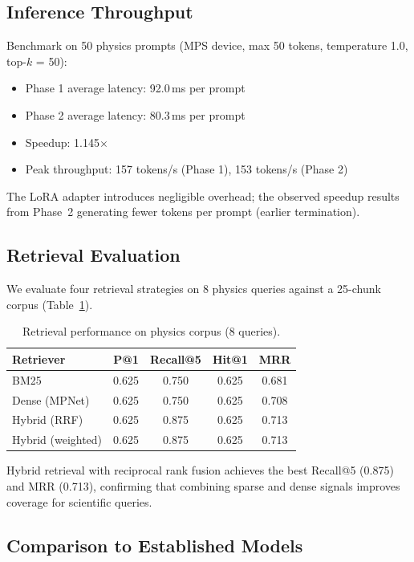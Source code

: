 \documentclass[11pt]{article}
\begin{document}
\subsection{Inference Throughput}

Benchmark on 50 physics prompts (MPS device, max 50 tokens, temperature 1.0, top-$k$ = 50):

\begin{itemize}[leftmargin=*]
    \item Phase 1 average latency: 92.0\,ms per prompt
    \item Phase 2 average latency: 80.3\,ms per prompt
    \item Speedup: 1.145$\times$
    \item Peak throughput: 157 tokens/s (Phase 1), 153 tokens/s (Phase 2)
\end{itemize}

The LoRA adapter introduces negligible overhead; the observed speedup results from Phase~2 generating fewer tokens per prompt (earlier termination).

\subsection{Retrieval Evaluation}

We evaluate four retrieval strategies on 8 physics queries against a 25-chunk corpus (Table~\ref{tab:retrieval}).

\begin{table}[t]
\centering
\caption{Retrieval performance on physics corpus (8 queries).}
\label{tab:retrieval}
\begin{tabular}{lcccc}
\toprule
\textbf{Retriever} & \textbf{P@1} & \textbf{Recall@5} & \textbf{Hit@1} & \textbf{MRR} \\
\midrule
BM25 & 0.625 & 0.750 & 0.625 & 0.681 \\
Dense (MPNet) & 0.625 & 0.750 & 0.625 & 0.708 \\
Hybrid (RRF) & 0.625 & 0.875 & 0.625 & 0.713 \\
Hybrid (weighted) & 0.625 & 0.875 & 0.625 & 0.713 \\
\bottomrule
\end{tabular}
\end{table}

Hybrid retrieval with reciprocal rank fusion achieves the best Recall@5 (0.875) and MRR (0.713), confirming that combining sparse and dense signals improves coverage for scientific queries.

\subsection{Comparison to Established Models}
\end{document}
